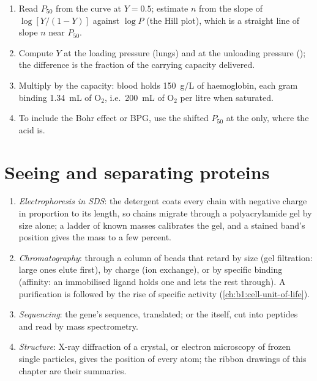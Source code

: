 \begin{method}\label{met:b1:proteins:hill}
\begin{enumerate}
  \item Read $P_{50}$ from the curve at $Y = 0.5$; estimate $n$ from
        the slope of $\log[Y/(1-Y)]$ against $\log P$ (the Hill plot),
        which is a straight line of slope $n$ near $P_{50}$.
  \item Compute $Y$ at the loading pressure (lungs) and at the
        unloading pressure (); the difference is the fraction
        of the carrying capacity delivered.
  \item Multiply by the capacity: blood holds \qty{150}{g/L} of
        haemoglobin, each gram binding \qty{1.34}{mL} of $\mathrm{O_2}$,
        i.e.\ \qty{200}{mL} of $\mathrm{O_2}$ per litre when saturated.
  \item To include the Bohr effect or BPG, use the shifted $P_{50}$ at
        the  only, where the acid is.
\end{enumerate}
\end{method}

\section{Seeing and separating proteins}

\begin{method}\label{met:b1:proteins:methods}
\begin{enumerate}
  \item \emph{Electrophoresis in SDS}: the detergent coats every chain
        with negative charge in proportion to its length, so chains
        migrate through a polyacrylamide gel by size alone; a ladder of
        known masses calibrates the gel, and a stained band's position
        gives the mass to a few percent.
  \item \emph{Chromatography}: through a column of beads that retard
         by size (gel filtration: large ones elute first), by
        charge (ion exchange), or by specific binding (affinity: an
        immobilised ligand holds one  and lets the rest through).
        A purification is followed by the rise of specific activity
        (\cref{ch:b1:cell-unit-of-life}).
  \item \emph{Sequencing}: the gene's sequence, translated; or the
         itself, cut into peptides and read by mass spectrometry.
  \item \emph{Structure}: X-ray diffraction of a crystal, or electron
        microscopy of frozen single particles, gives the position of
        every atom; the ribbon drawings of this chapter are their
        summaries.
\end{enumerate}
\end{method}

